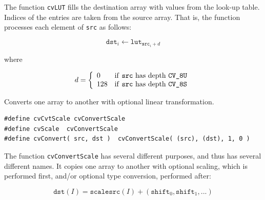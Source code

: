\begin{description}
\end{description}

The function \texttt{cvLUT} fills the destination array with values from the look-up table. Indices of the entries are taken from the source array. That is, the function processes each element of \texttt{src} as follows:

\[
\texttt{dst}_i \leftarrow \texttt{lut}_{\texttt{src}_i + d}
\]

where

\[
d = \left\{ \begin{array}{l l} 0 & \mbox{if \texttt{src} has depth \texttt{CV\_8U}}\\ 128 & \mbox{if \texttt{src} has depth \texttt{CV\_8S}}\\ \end{array} \right.
\]

\label{ConvertScale}

Converts one array to another with optional linear transformation.


\begin{lstlisting}
#define cvCvtScale cvConvertScale
#define cvScale  cvConvertScale
#define cvConvert( src, dst )  cvConvertScale( (src), (dst), 1, 0 )
\end{lstlisting}

\begin{description}
\end{description}


The function \texttt{cvConvertScale} has several different purposes, and thus has several different names. It copies one array to another with optional scaling, which is performed first, and/or optional type conversion, performed after:

\[
\texttt{dst}(I) = \texttt{scale} \texttt{src}(I) + (\texttt{shift}_0,\texttt{shift}_1,...)
\]

